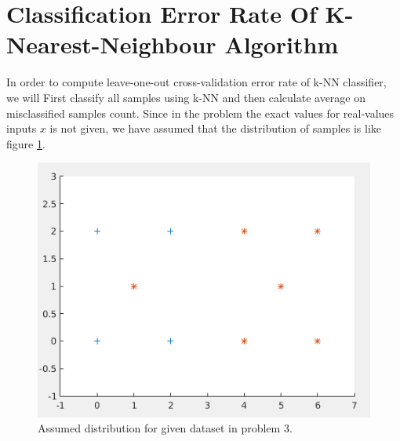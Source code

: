 \documentclass[12pt]{article}
\begin{document}
\section{Classification Error Rate Of K-Nearest-Neighbour Algorithm}
In order to compute leave-one-out cross-validation error rate of k-NN classifier, we will First classify all samples using k-NN and then calculate average on misclassified samples count. Since in the problem the exact values for real-values inputs $x$ is not given, we have assumed that the distribution of samples is like figure \ref{fig:3-1}.
\begin{figure}[h]
\centering
\includegraphics[scale=0.4]{Imgs/3-1.png}
\caption{Assumed distribution for given dataset in problem 3.}
\label{fig:3-1}
\end{figure}
\end{document}
